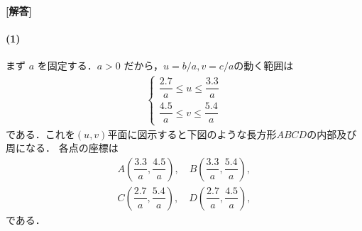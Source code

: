 \documentclass[../../main.tex]{subfiles}
\begin{document}
\begin{oframed}
  
\end{oframed}

{\bf [解答]}

\paragraph{(1)}
まず $a$ を固定する．$a > 0$ だから，$u=b/a,v=c/a$の動く範囲は
\begin{align}
  \begin{cases}
    \dfrac{2.7}{a} \le u \le \dfrac{3.3}{a} \\
    \dfrac{4.5}{a} \le v \le \dfrac{5.4}{a}
  \end{cases} \label{eq:1}
\end{align}
である．これを$(u,v)$平面に図示すると下図のような長方形$ABCD$の内部及び周になる．
各点の座標は
\begin{align}
  A\left(\dfrac{3.3}{a},\dfrac{4.5}{a}\right), \quad
  B\left(\dfrac{3.3}{a},\dfrac{5.4}{a}\right), \\
  C\left(\dfrac{2.7}{a},\dfrac{5.4}{a}\right), \quad
  D\left(\dfrac{2.7}{a},\dfrac{4.5}{a}\right),
\end{align}
である．
\end{document}
